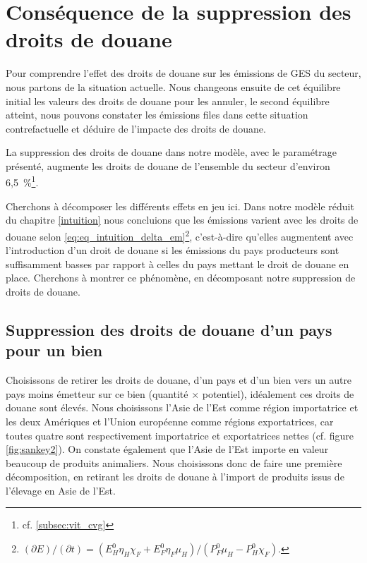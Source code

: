 \section{Conséquence de la suppression des droits de douane}

Pour comprendre l'effet des droits de douane sur les émissions de GES du secteur, nous partons de la situation actuelle. Nous changeons ensuite de cet équilibre initial les valeurs des droits de douane pour les annuler, le second équilibre atteint, nous pouvons constater les émissions files dans cette situation contrefactuelle et déduire de l'impacte des droits de douane.

La suppression des droits de douane dans notre modèle, avec le paramétrage présenté, augmente les droits de douane de l'ensemble du secteur d'environ 6,5~\%\footnote{cf. \ref{subsec:vit_cvg}}.

Cherchons à décomposer les différents effets en jeu ici. Dans notre modèle réduit du chapitre \ref{intuition} nous concluions que les émissions varient avec les droits de douane selon \ref{eq:eq_intuition_delta_em}\footnote{$\left({\partial E}\right)/\left( {\partial t} \right) = \left( {E_H^0 \eta_H \chi_F + E_F^0 \eta_F \mu_H} \right)/\left( {P_F^0 \mu_H - P_H^0 \chi_F} \right).$}, c'est-à-dire qu'elles augmentent avec l'introduction d'un droit de douane si les émissions du pays producteurs sont suffisamment basses par rapport à celles du pays mettant le droit de douane en place. Cherchons à montrer ce phénomène, en décomposant notre suppression de droits de douane.

\subsection{Suppression des droits de douane d'un pays pour un bien}

Choisissons de retirer les droits de douane, d'un pays et d'un bien vers un autre pays moins émetteur sur ce bien (quantité $\times$ potentiel), idéalement ces droits de douane sont élevés. Nous choisissons l'Asie de l'Est comme région importatrice et les deux Amériques et l'Union européenne comme régions exportatrices, car toutes quatre sont respectivement importatrice et exportatrices nettes (cf. figure \ref{fig:sankey2}). On constate également que l'Asie de l'Est importe en valeur beaucoup de produits animaliers. Nous choisissons donc de faire une première décomposition, en retirant les droits de douane à l'import de produits issus de l'élevage en Asie de l'Est.

